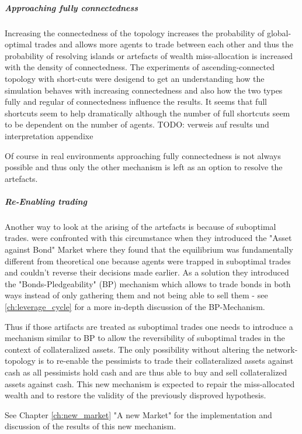 \documentclass[Bachelorarbeit.tex]{subfiles}
\begin{document}
\subparagraph{Approaching fully connectedness}
Increasing the connectedness of the topology increases the probability of global-optimal trades and allows more agents to trade between each other and thus the probability of resolving islands or artefacts of wealth miss-allocation is increased with the density of connectedness.
The experiments of ascending-connected topology with short-cuts were desigend to get an understanding how the simulation behaves with increasing connectedness and also how the two types fully and regular of connectedness influence the results.
It seems that full shortcuts seem to help dramatically although the number of full shortcuts seem to be dependent on the number of agents.
TODO: verweis auf results und interpretation appendixe

Of course in real environments approaching fully connectedness is not always possible and thus only the other mechanism is left as an option to resolve the artefacts.

\subparagraph{Re-Enabling trading}
Another way to look at the arising of the artefacts is because of suboptimal trades. \cite{Breuer2015} were confronted with this circumstance when they introduced the "Asset against Bond" Market where they found that the equilibrium was fundamentally different from theoretical one because agents were trapped in suboptimal trades and couldn't reverse their decisions made earlier. As a solution they introduced the "Bonds-Pledgeability" (BP) mechanism which allows to trade bonds in both ways instead of only gathering them and not being able to sell them - see \ref{ch:leverage_cycle} for a more in-depth discussion of the BP-Mechanism.

\medskip 

Thus if those artifacts are treated as suboptimal trades one needs to introduce a mechanism similar to BP to allow the reversibility of suboptimal trades in the context of collateralized assets. The only possibility without altering the network-topology is to re-enable the pessimists to trade their collateralized assets against cash as all pessimists hold cash and are thus able to buy and sell collateralized assets against cash. This new mechanism is expected to repair the miss-allocated wealth and to restore the validity of the previously disproved hypothesis.

\medskip 

See Chapter \ref{ch:new_market} "A new Market" for the implementation and discussion of the results of this new mechanism.
\end{document}
